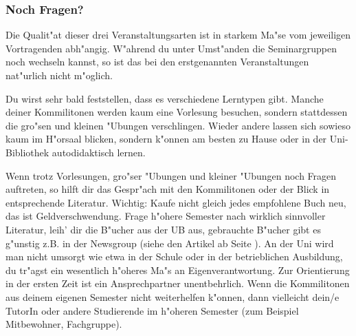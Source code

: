 \subsubsection*{Noch Fragen?}

Die Qualit"at dieser drei Veranstaltungsarten ist in starkem Ma"se vom
jeweiligen Vortragenden abh"angig. W"ahrend du unter Umst"anden die
Seminargruppen noch wechseln kannst, so ist das bei den erstgenannten
Veranstaltungen nat"urlich nicht m"oglich.

Du wirst sehr bald feststellen, dass es verschiedene Lerntypen gibt. Manche
deiner Kommilitonen werden kaum eine Vorlesung besuchen, sondern stattdessen die gro"sen
und kleinen "Ubungen verschlingen. Wieder andere lassen sich sowieso kaum im
H"orsaal blicken, sondern k"onnen am besten zu Hause oder in der Uni-Bibliothek
autodidaktisch lernen.

Wenn trotz Vorlesungen, gro"ser "Ubungen und kleiner "Ubungen noch Fragen
auftreten, so hilft dir das Gespr"ach mit den Kommilitonen oder der Blick in
entsprechende Literatur.
Wichtig: Kaufe nicht gleich jedes empfohlene Buch neu,
das ist Geldverschwendung. Frage h"ohere Semester nach wirklich sinnvoller
Literatur, leih' dir die B"ucher aus der UB aus, gebrauchte B"ucher gibt es
g"unstig z.B. in der Newsgroup  (siehe den Artikel
ab Seite \pageref{elekinf}). An der Uni wird man nicht umsorgt wie etwa in der
Schule oder in der betrieblichen Ausbildung, du tr"agst ein wesentlich h"oheres
Ma"s an Eigenverantwortung. Zur Orientierung in der ersten Zeit ist ein
Ansprechpartner unentbehrlich. Wenn die Kommilitonen aus
deinem eigenen Semester nicht weiterhelfen k"onnen, dann vielleicht dein/e TutorIn oder andere
Studierende im h"oheren Semester (zum Beispiel Mitbewohner, Fachgruppe).
